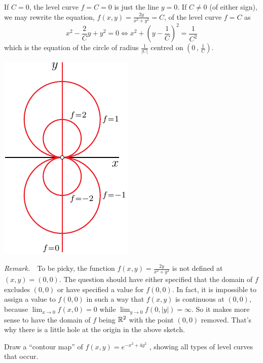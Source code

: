 \begin{solution}
 If $C=0$, the level curve $f=C=0$ is just the line $y=0$.
If $C\ne 0$ (of either sign), we may rewrite the equation, $f(x,y)=\frac{2y}{x^2+y^2}=C$,
of the level curve $f=C$ as 
\begin{equation*}
x^2-\frac{2}{C}y+y^2=0
\iff x^2+\left(y-\frac{1}{C}\right)^2 =\frac{1}{C^2} 
\end{equation*}
which is the equation of the circle of radius $\frac{1}{|C|}$ centred on
$\left(0\,,\,\frac{1}{C}\right)$.

\begin{center}
     \includegraphics{fig/OE10D_1.pdf}
\end{center}

\emph{Remark.}\ \  
To be picky, the function $f(x,y)=\frac{2y}{x^2+y^2}$
is not defined at $(x,y)=(0,0)$. The question should have either specified
that the domain of $f$ excludes $(0,0)$ or have specified a value 
for $f(0,0)$. In fact, it is impossible to assign a value to $f(0,0)$
in such a way that $f(x,y)$ is continuous at $(0,0)$, because
$\lim_{x\rightarrow 0}f(x,0)=0$ while  $\lim_{y\rightarrow 0}f(0,|y|)=\infty$.
So it makes more sense to have the domain of $f$ being $\mathbb{R}^2$  
with the point $(0,0)$ removed. That's why there is a little hole at the origin
in the above sketch.
\end{solution}


\begin{question}[M200 2011D] %
Draw a ``contour map'' of $f(x, y) = e^{-x^2 +4y^2}$ , showing all types of level curves that occur.
\end{question}

